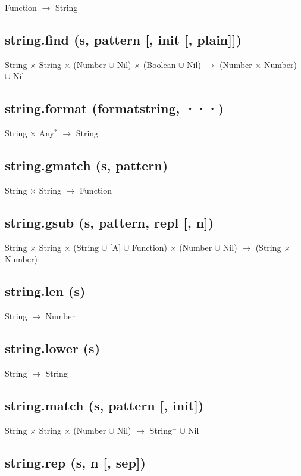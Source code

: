 \documentclass[12pt]{article}
\begin{document}
Function $\rightarrow$ String

\subsection{string.find (s, pattern [, init [, plain]])}

String $\times$ String $\times$
(Number $\cup$ Nil) $\times$
(Boolean $\cup$ Nil) $\rightarrow$
(Number $\times$ Number) $\cup$ Nil

\subsection{string.format (formatstring, ···)}

String $\times$ Any$^*$ $\rightarrow$ String

\subsection{string.gmatch (s, pattern)}

String $\times$ String $\rightarrow$ Function

\subsection{string.gsub (s, pattern, repl [, n])}

String $\times$
String $\times$
(String $\cup$ [A] $\cup$ Function) $\times$
(Number $\cup$ Nil) $\rightarrow$
(String $\times$ Number)

\subsection{string.len (s)}

String $\rightarrow$ Number

\subsection{string.lower (s)}

String $\rightarrow$ String

\subsection{string.match (s, pattern [, init])}

String $\times$
String $\times$
(Number $\cup$ Nil) $\rightarrow$
String$^+$ $\cup$ Nil

\subsection{string.rep (s, n [, sep])}
\end{document}
